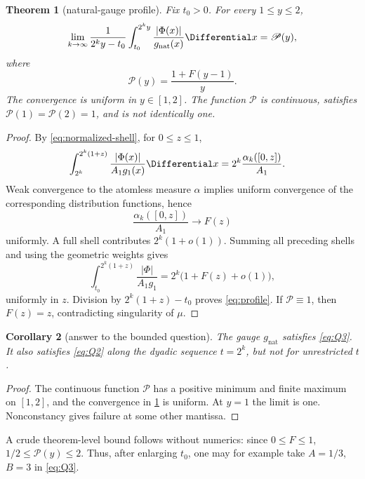 \documentclass[11pt,oneside]{article}
\newtheorem{theorem}{Theorem}[section]
\newtheorem{corollary}[theorem]{Corollary}
\theoremstyle{definition}
\theoremstyle{remark}
\begin{document}
\begin{theorem}[natural-gauge profile]
\label{thm:profile}
Fix \(t_0>0\).  For every \(1\le y\le2\),
\begin{equation}
 \lim_{k\to\infty}
 \frac1{2^ky-t_0}\int_{t_0}^{2^ky}
 \frac{|\Phi(x)|}{g_{\mathrm{nat}}(x)}\Differential x
 =\mathscr P(y),
 \label{eq:profile-limit}
\end{equation}
where
\begin{equation}
 \boxed{
 \mathscr P(y)=\frac{1+F(y-1)}{y}.}
 \label{eq:profile}
\end{equation}
The convergence is uniform in \(y\in[1,2]\).  The function \(\mathscr P\)
is continuous, satisfies \(\mathscr P(1)=\mathscr P(2)=1\), and is not
identically one.
\end{theorem}

\begin{proof}
By \eqref{eq:normalized-shell}, for \(0\le z\le1\),
\begin{align}
 \int_{2^k}^{2^k(1+z)}\frac{|\Phi(x)|}{A_1g_1(x)}\Differential x
 &=2^k\frac{\alpha_k([0,z])}{A_1}.
 \label{eq:partial-shell}
\end{align}
Weak convergence to the atomless measure \(\alpha\) implies uniform
convergence of the corresponding distribution functions, hence
\[
 \frac{\alpha_k([0,z])}{A_1}\longrightarrow F(z)
\]
uniformly.  A full shell contributes \(2^k(1+o(1))\).  Summing all preceding
shells and using the geometric weights gives
\[
 \int_{t_0}^{2^k(1+z)}\frac{|\Phi|}{A_1g_1}
 =2^k\bigl(1+F(z)+o(1)\bigr),
\]
uniformly in \(z\).  Division by \(2^k(1+z)-t_0\) proves
\eqref{eq:profile}.  If \(\mathscr P\equiv1\), then
\(F(z)=z\), contradicting singularity of \(\mu\).
\end{proof}

\begin{corollary}[answer to the bounded question]
\label{cor:Q3}
The gauge \(g_{\mathrm{nat}}\) satisfies \eqref{eq:Q3}.  It also satisfies
\eqref{eq:Q2} along the dyadic sequence \(t=2^k\), but not for unrestricted
\(t\).
\end{corollary}

\begin{proof}
The continuous function \(\mathscr P\) has a positive minimum and finite
maximum on \([1,2]\), and the convergence in \cref{thm:profile} is uniform.
At \(y=1\) the limit is one.  Nonconstancy gives failure at some other
mantissa.
\end{proof}

A crude theorem-level bound follows without numerics: since \(0\le F\le1\),
\(1/2\le\mathscr P(y)\le2\).  Thus, after enlarging \(t_0\), one may for
example take \(A=1/3\), \(B=3\) in \eqref{eq:Q3}.
\end{document}

